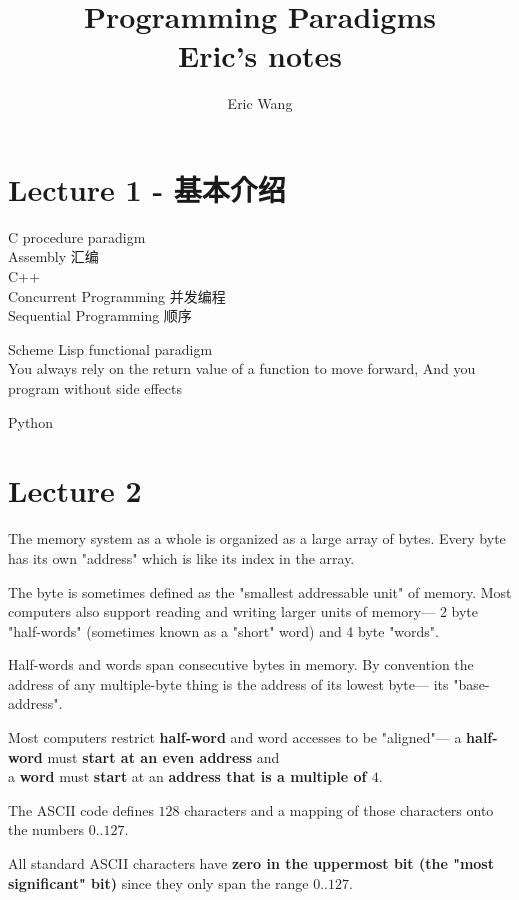 \documentclass{article}
\begin{document}
\title{Programming Paradigms\\ Eric's notes}
\author{Eric Wang}
\maketitle
\newpage
\tableofcontents
\newpage
\section{Lecture 1 - 基本介绍}
C procedure paradigm\\
Assembly 汇编\\
C++\\
Concurrent Programming 并发编程\\
Sequential Programming 顺序

Scheme Lisp functional paradigm\\
You always rely on the return value of a function to move forward, And you program without side effects

Python

\section{Lecture 2}
The memory system as a whole is organized as a large array of bytes. Every byte has its
own "address" which is like its index in the array.

The byte is sometimes defined as the "smallest addressable unit" of memory. Most computers also support reading and writing larger units of memory— 2 byte "half-words" (sometimes known as a "short" word) and 4 byte "words".

Half-words and words span consecutive bytes in memory. By convention the address of any multiple-byte thing is the address of its lowest byte— its "base-address".

Most computers restrict \textbf{half-word} and word accesses to be "aligned"—
\indent a \textbf{half-word} must \textbf{start at an even address} and \\
\indent a \textbf{word} must \textbf{start} at an \textbf{address that is a multiple of $4$}.

The ASCII code defines $128$ characters and a mapping of those characters onto the numbers $0..127$.

All standard ASCII characters have \textbf{zero in the uppermost bit (the "most significant" bit)} since they only span the range $0..127$.
\end{document}
